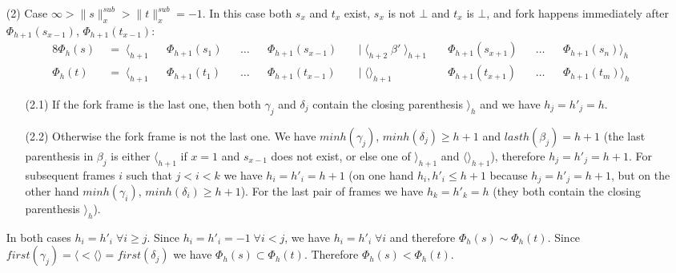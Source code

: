 \documentclass[AMA,STIX1COL]{WileyNJD-v2}
\newcommand{\Xl}{\langle}
\newcommand{\Xr}{\rangle}
\newcommand{\Xm}{\langle\!\rangle}
\newcommand{\snorm}[2]{\|{#1}\|^{sub}_{#2}}
\begin{document}
\begin{proofEnd}
\begin{itemize}[itemsep=0.2em, topsep=0.5em]
    \item[(2)]
        Case $\infty > \snorm{s}{x} > \snorm{t}{x} = -1$.
        In this case both $s_x$ and $t_x$ exist,
        $s_x$ is not $\bot$ and $t_x$ is $\bot$,
        and fork happens immediately after $\Phi_{h+1}(s_{x-1})$, $\Phi_{h+1}(t_{x-1})$:
        \begin{alignat*}{8}
            \Phi_{h}(s) &\;=\; \Xl_{h+1} &&\Phi_{h+1}(s_1) &&\dots &&\Phi_{h+1}(s_{x-1})
                &&\;\big|\; \Xl_{h+2} \; \beta' \; \Xr_{h+1} \; &&\Phi_{h+1}(s_{x+1}) &&\dots &&\Phi_{h+1}(s_n) \Xr_{h} \\[-0.5em]
            \Phi_{h}(t) &\;=\; \Xl_{h+1} &&\Phi_{h+1}(t_1) &&\dots &&\Phi_{h+1}(t_{x-1})
                &&\;\big|\; \Xm_{h+1} \;\;\;\;\;\;              &&\Phi_{h+1}(t_{x+1}) &&\dots &&\Phi_{h+1}(t_m) \Xr_{h}
        \end{alignat*}
        \begin{itemize}
        \item[(2.1)]
            If the fork frame is the last one,
            then both $\gamma_j$ and $\delta_j$ contain the closing parenthesis $\Xr_{h}$
            and we have $h_j = h'_j = h$.

        \item[(2.2)]
            Otherwise the fork frame is not the last one.
            We have $minh(\gamma_j)$, $minh(\delta_j) \geq h + 1$
            and $lasth (\beta_j) = h + 1$
            (the last parenthesis in $\beta_j$ is either $\Xl_{h+1}$ if $x = 1$ and $s_{x-1}$ does not exist,
            or else one of $\Xr_{h+1}$ and $\Xm_{h+1}$),
            therefore $h_j = h'_j = h + 1$.
            For subsequent frames $i$ such that $j < i < k$ we have $h_i = h'_i = h + 1$
            (on one hand $h_i, h'_i \leq h + 1$ because $h_j = h'_j = h + 1$,
            but on the other hand $minh(\gamma_i)$, $minh(\delta_i) \geq h + 1$).
            For the last pair of frames we have $h_k = h'_k = h$ (they both contain the closing parenthesis $\Xr_{h}$).
        \end{itemize}

        In both cases $h_i = h'_i \;\forall i \geq j$.
        Since $h_i = h'_i = -1 \;\forall i < j$,
        we have $h_i = h'_i \;\forall i$ and therefore $\Phi_{h}(s) \sim \Phi_{h}(t)$.
        Since $first (\gamma_j) = \Xl < \Xm = first (\delta_j)$ we have $\Phi_{h}(s) \subset \Phi_{h}(t)$.
        Therefore $\Phi_{h}(s) < \Phi_{h}(t)$.


\end{itemize}
\end{proofEnd}
\end{document}
